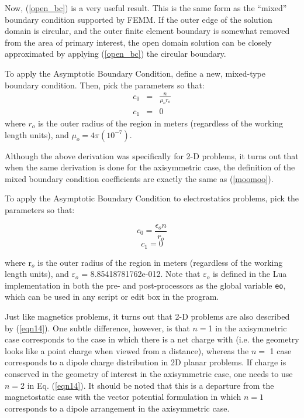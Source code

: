 \documentclass[12pt]{report}
\begin{document}
Now, (\ref{open_bc}) is a very useful result.  This is the same
form as the ``mixed'' boundary condition supported by FEMM.  If the
outer edge of the solution domain is circular, and the outer finite
element boundary is somewhat removed from the area of primary
interest, the open domain solution can be closely approximated by
applying (\ref{open_bc}) the circular boundary.

To apply the Asymptotic Boundary Condition, define a new,
mixed-type boundary condition.  Then, pick the parameters so that:
\begin{eqnarray} c_0 & = & \frac{n}{\mu_o r_o} \label{moomoo} \\
                 c_1 & = & 0
\end{eqnarray}
where $r_o$ is the outer radius of the region in meters (regardless
of the working length units), and $\mu_o = 4 \pi (10^{-7})$.

Although the above derivation was specifically for 2-D problems, it
turns out that when the same derivation is done for the
axisymmetric case, the definition of the mixed boundary condition
coefficients are exactly the same as (\ref{moomoo}).


To apply the Asymptotic Boundary Condition to electrostatics
problems, pick the parameters so that:

\begin{equation} \label{eqn14}
c_0 = \frac{\epsilon_o n}{r_o}
\end{equation}
\begin{displaymath}
c_1 = 0
\end{displaymath}

\noindent where r$_{o}$ is the outer radius of the region in meters
(regardless of the working length units), and $\varepsilon _{o}$ =
8.85418781762e-012. Note that $\varepsilon _{o}$ is defined in the
Lua implementation in both the pre- and post-processors as the
global variable \texttt{eo}, which can be used in any script or
edit box in the program.

Just like magnetics problems, it turns out that 2-D problems are
also described by (\ref{eqn14}). One subtle difference, however, is
that $n = $1 in the axisymmetric case corresponds to the case in
which there is a net charge with (i.e. the geometry looks like a
point charge when viewed from a distance), whereas the $n =$ 1 case
corresponds to a dipole charge distribution in 2D planar problems.
If charge is conserved in the geometry of interest in the
axisymmetric case, one needs to use $n
= $2 in Eq. (\ref{eqn14}). It should be noted that this is a departure from
the magnetostatic case with the vector potential formulation in
which $n = 1$ corresponds to a dipole arrangement in the
axisymmetric case.
\end{document}
